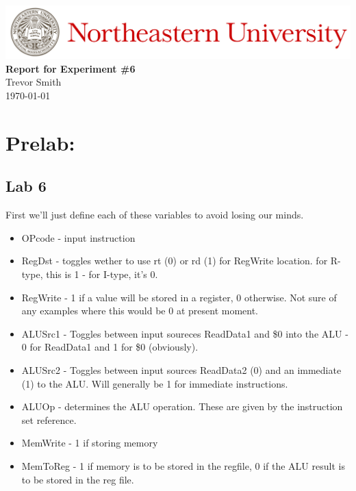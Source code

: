 \documentclass[12pt,a4paper]{article}
\begin{document}
\begin{center}
    \includegraphics[width=\textwidth]{./Images/Header.jpeg}
    \vfill
    \textbf{\Large{Report for Experiment \#6\\
    }}
    \vfill
    Trevor Smith\\
    \today
    \vfill
\end{center}

\newpage


\section*{Prelab:}
\subsection*{Lab 6}

First we'll just define each of these variables to avoid losing our minds. \\

\begin{itemize}
	\item OPcode - input instruction
	\item RegDst - toggles wether to use rt (0) or rd (1) for RegWrite location.
		for R-type, this is 1 - for I-type, it's 0.
	\item RegWrite - 1 if a value will be stored in a register, 0 otherwise. Not sure of any
		examples where this would be 0 at present moment.
	\item ALUSrc1 - Toggles between input soureces ReadData1 and \$0 into the ALU - 0
		for ReadData1 and 1 for \$0 (obviously).
	\item ALUSrc2 - Toggles between input sources ReadData2 (0) and an immediate (1) to
		the ALU. Will generally be 1 for immediate instructions.
	\item ALUOp - determines the ALU operation. These are given by the instruction set
		reference.
	\item MemWrite - 1 if storing memory
	\item MemToReg - 1 if memory is to be stored in the regfile, 0 if the ALU result
		is to be stored in the reg file.
\end{itemize}
\end{document}
